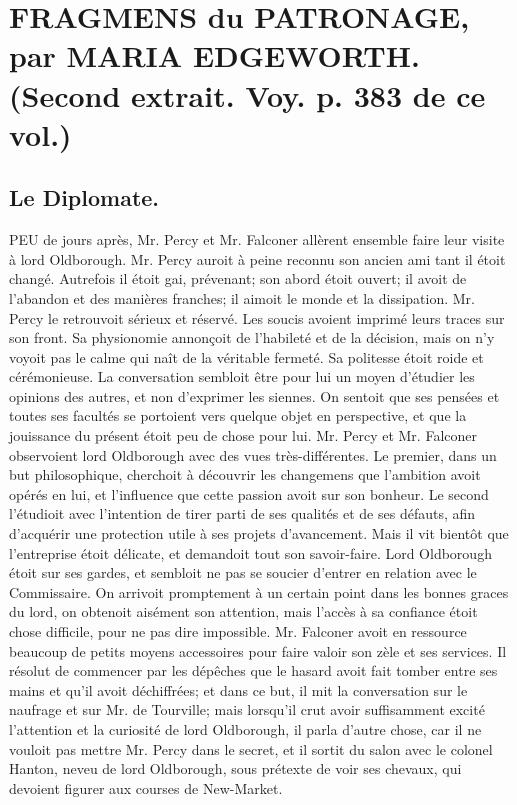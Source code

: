 \setcounter{page}{512}
\section{FRAGMENS du PATRONAGE, par MARIA EDGEWORTH. \large{(Second extrait. Voy. p. 383 de ce vol.)}}
\subsection{Le Diplomate.}
PEU de jours après, Mr. Percy et Mr. Falconer allèrent ensemble faire leur visite à lord Oldborough. Mr. Percy auroit à peine reconnu son ancien ami tant il étoit changé. Autrefois il étoit gai, prévenant; son abord étoit ouvert; il avoit de l’abandon et des manières franches; il aimoit le monde et la dissipation.
Mr. Percy le retrouvoit sérieux et réservé. Les soucis avoient imprimé leurs traces sur son front. Sa physionomie annonçoit de l’habileté et de la décision, mais on n’y voyoit pas le calme qui naît de la véritable fermeté. Sa politesse étoit roide et cérémonieuse. La conversation sembloit être pour lui un moyen d’étudier les opinions des autres, et non d’exprimer les siennes. On sentoit que ses pensées et toutes ses facultés se portoient vers quelque objet en perspective, et que la jouissance du présent étoit peu de chose pour lui.\setcounter{page}{513}
Mr. Percy et Mr. Falconer observoient lord Oldborough avec des vues très-différentes. Le premier, dans un but philosophique, cherchoit à découvrir les changemens que l'ambition avoit opérés en lui, et l'influence que cette passion avoit sur son bonheur. Le second l'étudioit avec l'intention de tirer parti de ses qualités et de ses défauts, afin d'acquérir une protection utile à ses projets d'avancement. Mais il vit bientôt que l'entreprise étoit délicate, et demandoit tout son savoir-faire. Lord Oldborough étoit sur ses gardes, et sembloit ne pas se soucier d'entrer en relation avec le Commissaire.
On arrivoit promptement à un certain point dans les bonnes graces du lord, on obtenoit aisément son attention, mais l'accès à sa confiance étoit chose difficile, pour ne pas dire impossible.
Mr. Falconer avoit en ressource beaucoup de petits moyens accessoires pour faire valoir son zèle et ses services. Il résolut de commencer par les dépêches que le hasard avoit fait tomber entre ses mains et qu'il avoit déchiffrées; et dans ce but, il mit la conversation sur le naufrage et sur Mr. de Tourville; mais lorsqu'il crut avoir suffisamment excité l'attention et la curiosité de lord Oldborough, il parla d'autre chose, car il ne\setcounter{page}{514} vouloit pas mettre Mr. Percy dans le secret, et il sortit du salon avec le colonel Hanton, neveu de lord Oldborough, sous prétexte de voir ses chevaux, qui devoient figurer aux courses de New-Market.

